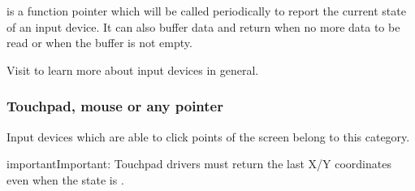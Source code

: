\documentclass[letterpaper,10pt,english]{sphinxmanual}
\begin{document}
 is a function pointer which will be called periodically to report the current state of an input device.
It can also buffer data and return  when no more data to be read or  when the buffer is not empty.

Visit {\hyperref[\detokenize{overview/indev::doc}]{}} to learn more about input devices in general.


\subsubsection{Touchpad, mouse or any pointer}
\label{\detokenize{porting/indev:touchpad-mouse-or-any-pointer}}
Input devices which are able to click points of the screen belong to this category.

\begin{sphinxVerbatim}[commandchars=\\\{\}]
  
  


    
       
      
        
      
\end{sphinxVerbatim}

\begin{sphinxadmonition}{important}{Important:}
Touchpad drivers must return the last X/Y coordinates even when the state is .
\end{sphinxadmonition}
\end{document}
